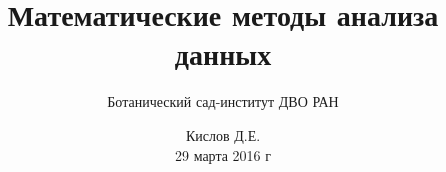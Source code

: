 \documentclass[fullscreen=true]{beamer}
\begin{document}
\title{Математические методы анализа данных}
\author{Ботанический сад-институт ДВО РАН}%
\date{Кислов Д.Е. \\ 29 марта 2016 г}
\maketitle
\end{document}
